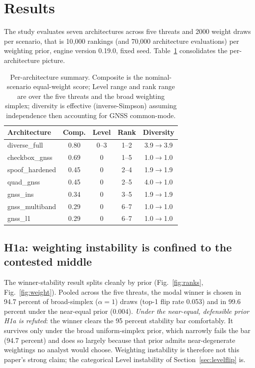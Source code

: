 \documentclass[conference]{IEEEtran}
\begin{document}
\section{Results}
\label{sec:results}
The study evaluates seven architectures across five threats and 2000 weight draws per scenario, that is 10{,}000 rankings (and 70{,}000 architecture evaluations) per weighting prior, engine version 0.19.0, fixed seed. Table~\ref{tab:summary} consolidates the per-architecture picture.

\begin{table}[t]
\caption{Per-architecture summary. Composite is the nominal-scenario equal-weight score; Level range and rank range are over the five threats and the broad weighting simplex; diversity is effective (inverse-Simpson) assuming independence then accounting for GNSS common-mode.}
\label{tab:summary}
\centering
\footnotesize
\begin{tabular}{lcccc}
\toprule
Architecture & Comp. & Level & Rank & Diversity \\
\midrule
diverse\_full   & 0.80 & 0--3 & 1--2 & 3.9$\rightarrow$3.9 \\
checkbox\_gnss  & 0.69 & 0    & 1--5 & 1.0$\rightarrow$1.0 \\
spoof\_hardened & 0.45 & 0    & 2--4 & 1.9$\rightarrow$1.9 \\
quad\_gnss      & 0.45 & 0    & 2--5 & 4.0$\rightarrow$1.0 \\
gnss\_ins       & 0.34 & 0    & 3--5 & 1.9$\rightarrow$1.9 \\
gnss\_multiband & 0.29 & 0    & 6--7 & 1.0$\rightarrow$1.0 \\
gnss\_l1        & 0.29 & 0    & 6--7 & 1.0$\rightarrow$1.0 \\
\bottomrule
\end{tabular}
\end{table}

\subsection{H1a: weighting instability is confined to the contested middle}
The winner-stability result splits cleanly by prior (Fig.~\ref{fig:ranks}, Fig.~\ref{fig:weight}). Pooled across the five threats, the modal winner is chosen in 94.7 percent of broad-simplex ($\alpha=1$) draws (top-1 flip rate 0.053) and in 99.6 percent under the near-equal prior (0.004). \emph{Under the near-equal, defensible prior H1a is refuted}: the winner clears the 95 percent stability bar comfortably. It survives only under the broad uniform-simplex prior, which narrowly fails the bar (94.7 percent) and does so largely because that prior admits near-degenerate weightings no analyst would choose. Weighting instability is therefore not this paper's strong claim; the categorical Level instability of Section~\ref{sec:levelflip} is.
\end{document}

